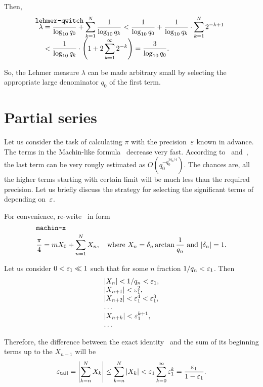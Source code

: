 \documentclass[draft, 11pt]{article} %
\begin{document}
Then,
%
\begin{equation}\mlabel{lehmer-switch}
\begin{array}{l}
\lambda = \dfrac{1}{\lg q_0} + \ds\sum_{k=1}^N \dfrac{1}{\lg q_k}
    < \dfrac{1}{\lg q_0} + \dfrac{1}{\lg q_k} \cdot \ds\sum_{k=1}^N 2^{-k+1} \\
\phantom{\lambda} < \dfrac{1}{\lg q_k} \cdot \left( 1 + 2\ds\sum_{k=1}^\infty 2^{-k} \right)
    = \dfrac{3}{\lg q_0}.
\end{array}
\end{equation}

So, the Lehmer measure $\lambda$ can be made arbitrary small by selecting
the appropriate large denominator $q_0$ of the first term.

\section{Partial series}

Let us consider the task of calculating $\pi$ with the precision~$\varepsilon$ known in advance.
The terms in the Machin-like formula~ decrease very fast.
According to~ and~, the last term
can be very rougly estimated as $O(q_0^{-q_0^{\pi q_0/4}})$.
The chances are, all the higher terms starting with certain limit will be much less
than the required precision. Let us briefly discuss the strategy for selecting
the significant terms of~ depending on~$\varepsilon$.

For convenience, re-write~ in form
%
\begin{equation}\mlabel{machin-x}
\dfrac{\pi}{4} = m X_0 + \ds\sum_{n=1}^N X_n, \quad
    \hbox{where $X_n = \delta_n \arctan\dfrac{1}{q_n}$ and $\absolute{\delta_n} = 1$.}
\end{equation}

Let us consider $0 < \varepsilon_1 \ll 1$ such that for some $n$ fraction $1/q_n < \varepsilon_1$.
Then
$$
\begin{array}{l}
\left| X_n \right| < 1/q_n < \varepsilon_1, \\
\left| X_{n+1} \right| < \varepsilon_1^2, \\
\left| X_{n+2} \right| < \varepsilon_1^4 < \varepsilon_1^3, \\
\dots \\
\left| X_{n+k} \right| < \varepsilon_1^{k+1}, \\
\dots \\
\end{array}
$$

Therefore, the difference between the exact identity~ and the sum
of its beginning terms up to the $X_{n-1}$ will be
$$
\varepsilon_{\mathrm{tail}} = \left| \displaystyle\sum_{k=n}^N X_k \right| \le \displaystyle\sum_{k=n}^N \left| X_k \right|
    < \varepsilon_1 \displaystyle\sum_{k=0}^\infty \varepsilon_1^k = \displaystyle\frac{\varepsilon_1}{1-\varepsilon_1}.
$$
\end{document}
